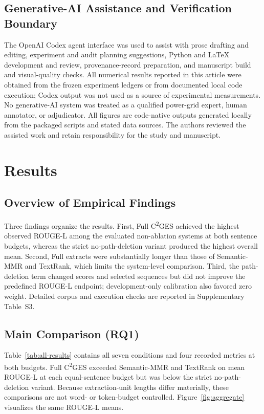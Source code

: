 \documentclass[applsci,article,submit,moreauthors]{Definitions/mdpi}
\newcommand{\cges}{C\textsuperscript{2}GES}
\begin{document}
\subsection{Generative-AI Assistance and Verification Boundary}

The OpenAI Codex agent interface was used to assist with prose drafting and editing, experiment and audit planning suggestions, Python and \LaTeX{} development and review, provenance-record preparation, and manuscript build and visual-quality checks. All numerical results reported in this article were obtained from the frozen experiment ledgers or from documented local code execution; Codex output was not used as a source of experimental measurements. No generative-AI system was treated as a qualified power-grid expert, human annotator, or adjudicator. All figures are code-native outputs generated locally from the packaged scripts and stated data sources. The authors reviewed the assisted work and retain responsibility for the study and manuscript.

\section{Results}

\subsection{Overview of Empirical Findings}

Three findings organize the results. First, Full \cges{} achieved the highest observed ROUGE-L among the evaluated non-ablation systems at both sentence budgets, whereas the strict no-path-deletion variant produced the highest overall mean. Second, Full extracts were substantially longer than those of Semantic-MMR and TextRank, which limits the system-level comparison. Third, the path-deletion term changed scores and selected sequences but did not improve the predefined ROUGE-L endpoint; development-only calibration also favored zero weight. Detailed corpus and execution checks are reported in Supplementary Table~S3.

\subsection{Main Comparison (RQ1)}

Table~\ref{tab:all-results} contains all seven conditions and four recorded metrics at both budgets. Full \cges{} exceeded Semantic-MMR and TextRank on mean ROUGE-L at each equal-sentence budget but was below the strict no-path-deletion variant. Because extraction-unit lengths differ materially, these comparisons are not word- or token-budget controlled. Figure~\ref{fig:aggregate} visualizes the same ROUGE-L means.
\end{document}
